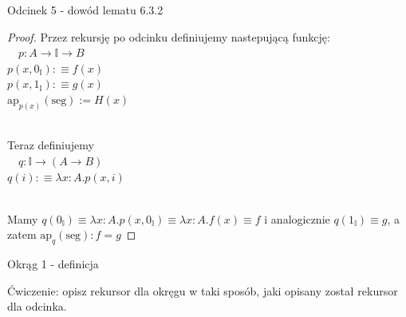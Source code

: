 \documentclass{beamer}
\newcommand{\defn}{:\equiv}
\newcommand{\ap}[2]{\text{ap}_{#1}(#2)}
\newcommand{\I}{\mathbb{I}}
\newcommand{\IZ}{0_\mathbb{I}}
\newcommand{\II}{1_\mathbb{I}}
\newcommand{\seg}{\text{seg}}
\begin{document}
\begin{frame}{Odcinek 5 - dowód lematu 6.3.2}
\begin{proof}
	Przez rekursję po odcinku definiujemy nastepującą funkcję: \\~\
	$p : A \to \I \to B$ \\
	$p(x, \IZ) \defn f(x)$ \\
	$p(x, \II) \defn g(x)$ \\
	$\ap{p(x)}{\seg} := H(x)$ \\~\
	
	Teraz definiujemy \\~\
	$q : \I \to (A \to B)$ \\
	$q(i) \defn \lambda x : A. p(x, i)$ \\~\
	
	Mamy $q(\IZ) \equiv \lambda x : A. p(x, \IZ) \equiv \lambda x : A. f(x) \equiv f$ i analogicznie $q(\II) \equiv g$, a zatem $\ap{q}{\seg} : f = g$
\end{proof}
\end{frame}


\begin{frame}{Okrąg 1 - definicja}


Ćwiczenie: opisz rekursor dla okręgu w taki sposób, jaki opisany został rekursor dla odcinka.

\end{frame}
\end{document}
